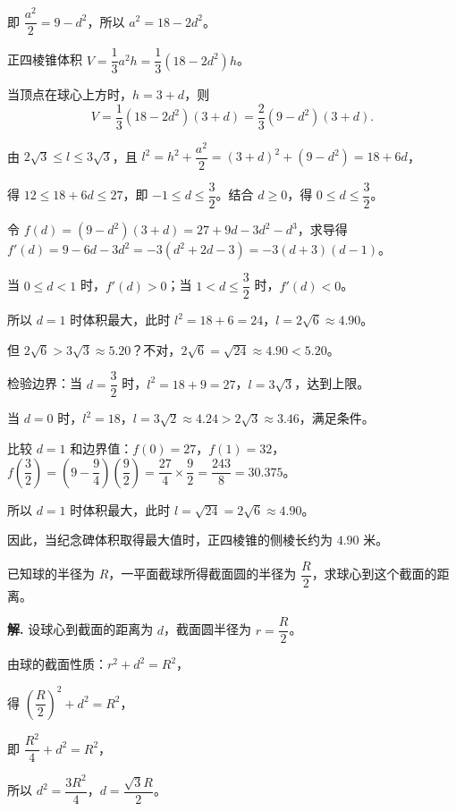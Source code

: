 \documentclass[11pt]{ctexrep}
\begin{document}
即 $\dfrac{a^2}{2} = 9 - d^2$，所以 $a^2 = 18 - 2d^2$。

正四棱锥体积 $V = \dfrac{1}{3}a^2 h = \dfrac{1}{3}(18 - 2d^2)h$。

当顶点在球心上方时，$h = 3 + d$，则
\[V = \dfrac{1}{3}(18 - 2d^2)(3 + d) = \dfrac{2}{3}(9 - d^2)(3 + d).\]

由 $2\sqrt{3} \leq l \leq 3\sqrt{3}$，且 $l^2 = h^2 + \dfrac{a^2}{2} = (3+d)^2 + (9-d^2) = 18 + 6d$，

得 $12 \leq 18 + 6d \leq 27$，即 $-1 \leq d \leq \dfrac{3}{2}$。结合 $d \geq 0$，得 $0 \leq d \leq \dfrac{3}{2}$。

令 $f(d) = (9-d^2)(3+d) = 27 + 9d - 3d^2 - d^3$，求导得 $f'(d) = 9 - 6d - 3d^2 = -3(d^2 + 2d - 3) = -3(d+3)(d-1)$。

当 $0 \leq d < 1$ 时，$f'(d) > 0$；当 $1 < d \leq \dfrac{3}{2}$ 时，$f'(d) < 0$。

所以 $d = 1$ 时体积最大，此时 $l^2 = 18 + 6 = 24$，$l = 2\sqrt{6} \approx 4.90$。

但 $2\sqrt{6} > 3\sqrt{3} \approx 5.20$？不对，$2\sqrt{6} = \sqrt{24} \approx 4.90 < 5.20$。

检验边界：当 $d = \dfrac{3}{2}$ 时，$l^2 = 18 + 9 = 27$，$l = 3\sqrt{3}$，达到上限。

当 $d = 0$ 时，$l^2 = 18$，$l = 3\sqrt{2} \approx 4.24 > 2\sqrt{3} \approx 3.46$，满足条件。

比较 $d = 1$ 和边界值：$f(0) = 27$，$f(1) = 32$，$f\left(\dfrac{3}{2}\right) = \left(9 - \dfrac{9}{4}\right)\left(\dfrac{9}{2}\right) = \dfrac{27}{4} \times \dfrac{9}{2} = \dfrac{243}{8} = 30.375$。

所以 $d = 1$ 时体积最大，此时 $l = \sqrt{24} = 2\sqrt{6} \approx 4.90$。

因此，当纪念碑体积取得最大值时，正四棱锥的侧棱长约为 $4.90$ 米。

\begin{realexam}[2024 上海一模]
    已知球的半径为 $R$，一平面截球所得截面圆的半径为 $\dfrac{R}{2}$，求球心到这个截面的距离。
\end{realexam}

\textbf{解.} 设球心到截面的距离为 $d$，截面圆半径为 $r = \dfrac{R}{2}$。

由球的截面性质：$r^2 + d^2 = R^2$，

得 $\left(\dfrac{R}{2}\right)^2 + d^2 = R^2$，

即 $\dfrac{R^2}{4} + d^2 = R^2$，

所以 $d^2 = \dfrac{3R^2}{4}$，$d = \dfrac{\sqrt{3}R}{2}$。
\end{document}
